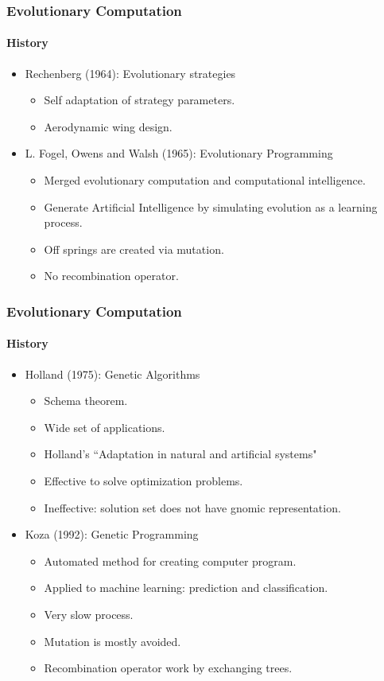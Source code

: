 \frame
{
	\frametitle{Evolutionary Computation}
	\framesubtitle{History}

	\begin{itemize}
		\item Rechenberg (1964): Evolutionary strategies
			\begin{itemize}
				\item Self adaptation of strategy parameters.
				\item Aerodynamic wing design.
			\end{itemize}
		\item L. Fogel, Owens and Walsh (1965): Evolutionary Programming
			\begin{itemize}
				\item Merged evolutionary computation and computational intelligence.
				\item Generate Artificial Intelligence by simulating evolution as a learning process.
				\item Off springs are created via mutation.
				\item No recombination operator.
			\end{itemize}
	\end{itemize}
}

\frame
{
	\frametitle{Evolutionary Computation}
	\framesubtitle{History}

	\begin{itemize}
		\item Holland (1975): Genetic Algorithms
			\begin{itemize}
				\item Schema theorem.
				\item Wide set of applications.
				\item Holland's ``Adaptation in natural and artificial systems"
				\item Effective to solve optimization problems.
				\item Ineffective: solution set does not have gnomic representation.
			\end{itemize}
		\item Koza (1992): Genetic Programming
			\begin{itemize}
				\item Automated method for creating computer program.
				\item Applied to machine learning: prediction and classification.
				\item Very slow process.
				\item Mutation is mostly avoided.
				\item Recombination operator work by exchanging trees.
			\end{itemize}
	\end{itemize}
}

